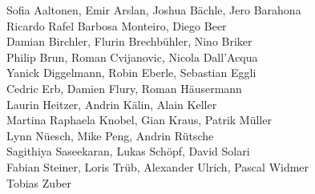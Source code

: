 %
%
%
Sofia Aaltonen,		%
Emir Arslan, 		%
Joshua Bächle,		%
Jero Barahona%
\\
Ricardo Rafel Barbosa Monteiro,	%
Diego Beer%
\\
Damian Birchler,	%
Flurin Brechbühler,	%
Nino Briker%
\\
Philip Brun,		%
Roman Cvijanovic,	%
Nicola Dall'Acqua%
\\
Yanick Diggelmann,	%
Robin Eberle,		%
Sebastian Eggli%
\\
Cedric Erb,		%
Damien Flury,		%
Roman Häusermann%
\\
Laurin Heitzer,		%
Andrin Kälin,		%
Alain Keller%
\\
Martina Raphaela Knobel,	%
Gian Kraus,		%
Patrik Müller%
\\
Lynn Nüesch,		%
Mike Peng,		%
Andrin Rütsche%
\\
Sagithiya Saseekaran,	%
Lukas Schöpf,		%
David Solari%
\\
Fabian Steiner,		%
Loris Trüb,		%
Alexander Ulrich,	%
Pascal Widmer%
\\
Tobias Zuber%
\\
